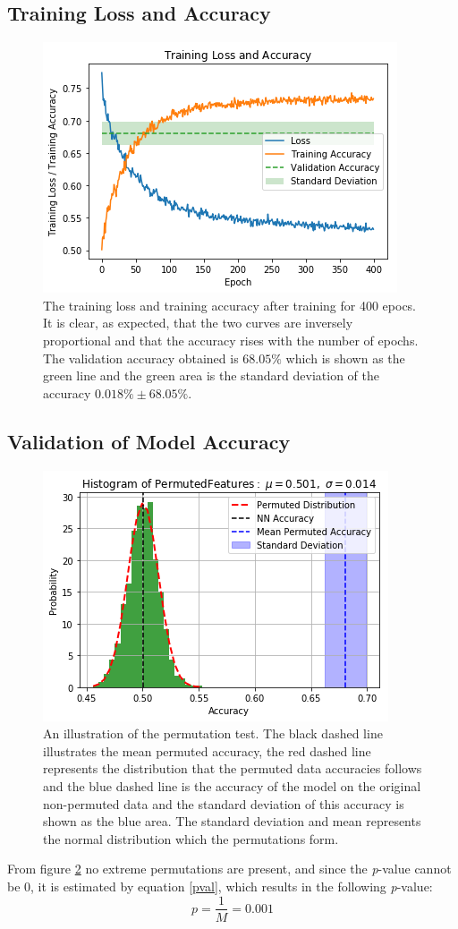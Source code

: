 \documentclass[11pt, fleqn, titlepage]{article}
\begin{document}
	\subsection{Training Loss and Accuracy}\label{training_loss_and_accuracy}
	
	\begin{figure}[H]
		\centering
		\includegraphics[width=0.5\linewidth]{imgs/loss_curve.png}
		\caption{The training loss and training accuracy after training for 400 epocs. It is clear, as expected, that the two curves are inversely proportional and that the accuracy rises with the number of epochs. The validation accuracy obtained is $ 68.05\%$ which is shown as the green line and the green area is the standard deviation of the accuracy $0.018\% \pm 68.05\%$.}
		\label{fig:losscurve}
	\end{figure}
	
	\subsection{Validation of Model Accuracy}\label{modelAccuracy}
	
	\begin{figure}[H]
		\centering
		\includegraphics[width=0.5\linewidth]{imgs/perm_test.png}
		\caption{An illustration of the permutation test. The black dashed line illustrates the mean permuted accuracy, the red dashed line represents the distribution that the permuted data accuracies follows and the blue dashed line is the accuracy of the model on the original non-permuted data and the standard deviation of this accuracy is shown as the blue area. The standard deviation and mean represents the normal distribution which the permutations form.}
		\label{fig:permtest}
	\end{figure}\noindent
	From figure \ref{fig:permtest} no extreme permutations are present, and since the \textit{p}-value cannot be 0, it is estimated by equation \ref{pval}, which results in the following \textit{p}-value:
	\[p=\frac{1}{M}=0.001\]
	
\end{document}
